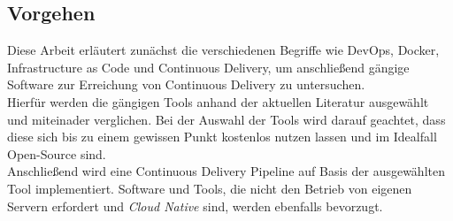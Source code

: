 \subsection{Vorgehen}\label{vorgehen}

Diese Arbeit erläutert zunächst die verschiedenen Begriffe wie DevOps, Docker, Infrastructure as Code und Continuous Delivery,
um anschließend gängige Software zur Erreichung von Continuous Delivery zu untersuchen. \\

Hierfür werden die gängigen Tools anhand der aktuellen Literatur ausgewählt und miteinader verglichen.
Bei der Auswahl der Tools wird darauf geachtet, dass diese sich bis zu einem gewissen Punkt kostenlos nutzen lassen und im Idealfall Open-Source sind. \\

Anschließend wird eine Continuous Delivery Pipeline auf Basis der ausgewählten Tool implementiert.
Software und Tools, die nicht den Betrieb von eigenen Servern erfordert und \textit{Cloud Native} sind, werden ebenfalls bevorzugt.